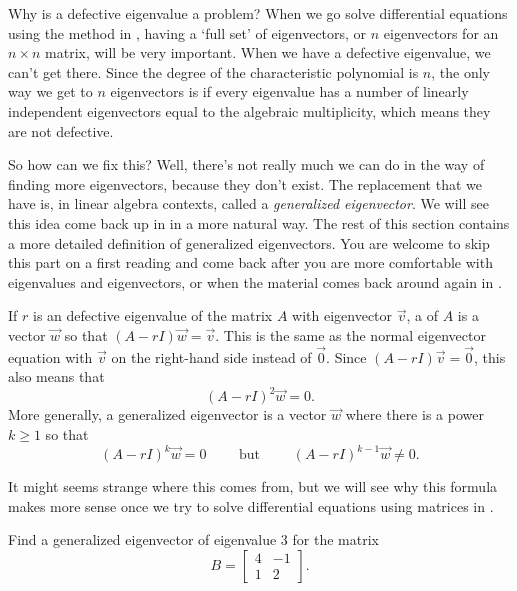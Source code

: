 \documentclass{ximera}
\begin{document}
Why is a defective eigenvalue a problem? When we go solve differential equations using the method in , having a `full set' of eigenvectors, or $n$ eigenvectors for an $n \times n$ matrix, will be very important. When we have a defective eigenvalue, we can't get there. Since the degree of the characteristic polynomial is $n$, the only way we get to $n$ eigenvectors is if every eigenvalue has a number of linearly independent eigenvectors equal to the algebraic multiplicity, which means they are not defective. 

So how can we fix this? Well, there's not really much we can do in the way of finding more eigenvectors, because they don't exist. The replacement that we have is, in linear algebra contexts, called a \emph{generalized eigenvector}. We will see this idea come back up in  in a more natural way. The rest of this section contains a more detailed definition of generalized eigenvectors. You are welcome to skip this part on a first reading and come back after you are more comfortable with eigenvalues and eigenvectors, or when the material comes back around again in .

If $r$ is an defective eigenvalue of the matrix $A$ with eigenvector $\vec{v}$, a \emph{} of $A$ is a vector $\vec{w}$ so that $(A - rI)\vec{w} = \vec{v}$. This is the same as the normal eigenvector equation with $\vec{v}$ on the right-hand side instead of $\vec{0}$. Since $(A - rI)\vec{v} = \vec{0}$, this also means that 
\[ 
    (A - rI)^2\vec{w} = 0. 
\] 
More generally, a generalized eigenvector is a vector $\vec{w}$ where there is a power $k \geq 1$ so that
\[ 
    (A - rI)^k\vec{w} = 0 \qquad \text{ but } \qquad (A - rI)^{k-1}\vec{w} \neq 0. 
\]

It might seems strange where this comes from, but we will see why this formula makes more sense once we try to solve differential equations using matrices in .

\begin{example}
    Find a generalized eigenvector of eigenvalue $3$ for the matrix 
    \[ 
        B = 
        \begin{bmatrix} 
            4 & -1 \\ 
            1 & 2 
        \end{bmatrix}.
    \]
\end{example}
\end{document}
